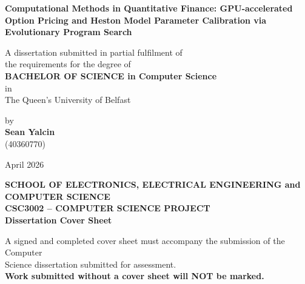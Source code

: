 \documentclass[11pt]{report}
\begin{document}
\nocite{yalcin_finalyearproject,heston_estimator,bse40360770}
\begin{titlepage}
    \centering

    \vspace*{3cm}

   {\LARGE \textbf{Computational Methods in Quantitative Finance: 
    GPU-accelerated Option Pricing and Heston Model Parameter Calibration 
    via Evolutionary Program Search} \par}
    \vspace{2cm}

    {\large
    A dissertation submitted in partial fulfilment of\\
    the requirements for the degree of\\[0.3cm]
    \textbf{BACHELOR OF SCIENCE in Computer Science}\\
    in\\
    The Queen's University of Belfast
    \par}
    {\large
    by\\[0.01cm]
    \textbf{Sean Yalcin}\\
    (40360770)
    \par}
    \vspace{2cm}
    {\large April 2026 \par}
    \vfill
\end{titlepage}

\newpage
\thispagestyle{empty}

\begin{center}

{\small \textbf{SCHOOL OF ELECTRONICS, ELECTRICAL ENGINEERING and COMPUTER SCIENCE}}\\[0.8cm]

{\small \textbf{CSC3002 – COMPUTER SCIENCE PROJECT}}\\[0.5cm]

{\large \textbf{Dissertation Cover Sheet}}\\[1cm]

\end{center}

{\small
A signed and completed cover sheet must accompany the submission of the Computer\\
Science dissertation submitted for assessment.\\[0.3cm]
\textbf{Work submitted without a cover sheet will NOT be marked.}
}

\vspace{1.2cm}
\end{document}
